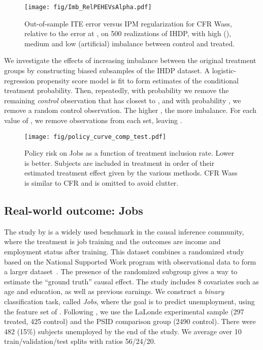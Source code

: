 \documentclass{article}
\begin{document}
\begin{figure}[t]
  \centering
  \texttt{[image: fig/Imb\_RelPEHEVsAlpha.pdf]}\vspace{-1em}
  \caption{\label{fig:ihdp_rel_imb}Out-of-sample ITE error versus IPM regularization for CFR Wass, relative to the error at , on 500 realizations of IHDP, with high (), medium and low (artificial) imbalance between control and treated.}
  \vspace{-1.2em}
\end{figure}

\vskip -5pt
We investigate the effects of increasing imbalance between the original treatment groups by constructing biased subsamples of the IHDP dataset. A logistic-regression propensity score model is fit to form estimates  of the conditional treatment probability. Then, repeatedly, with probability  we remove the remaining \emph{control} observation  that has  closest to , and with probability , we remove a random control observation. The higher , the more imbalance. For each value of , we remove  observations from each set, leaving .

\begin{figure}[t]
  \centering
  \texttt{[image: fig/policy\_curve\_comp\_test.pdf]}\vspace{-0.5em}
  \caption{\label{fig:policy_curve}Policy risk on Jobs as a function of treatment inclusion rate. Lower is better. Subjects are included in treatment in order of their estimated treatment effect given by the various methods. CFR Wass is similar to CFR and is omitted to avoid clutter. }
  \vspace{-1.2em}
\end{figure}

\subsection{Real-world outcome: Jobs}
\label{sec:nsw}
The study by \citet{lalonde1986evaluating} is a widely used benchmark in the causal inference community, where the treatment is job training and the outcomes are income and employment status after training. This dataset combines a randomized study based on the National Supported Work program with observational data to form a larger dataset~\citep{smith2005does}. The presence of the randomized subgroup gives a way to estimate the ``ground truth'' causal effect. The study includes 8 covariates such as age and education, as well as previous earnings. We construct a \emph{binary} classification task, called \emph{Jobs}, where the goal is to predict unemployment, using the feature set of \citet{dehejia2002propensity}. Following \citet{smith2005does}, we use the LaLonde experimental sample (297 treated, 425 control) and the PSID comparison group (2490 control). There were 482 (15\%) subjects unemployed by the end of the study. We average over 10 train/validation/test splits with ratios 56/24/20.
\end{document}
